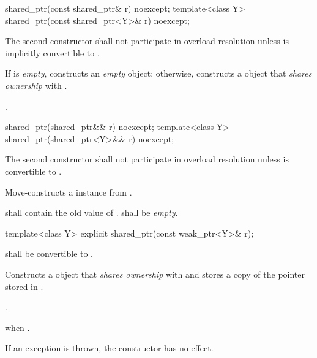 %
\begin{itemdecl}
shared_ptr(const shared_ptr& r) noexcept;
template<class Y> shared_ptr(const shared_ptr<Y>& r) noexcept;
\end{itemdecl}

\begin{itemdescr}
\pnum\remark
The second constructor shall not participate in overload resolution unless
 is implicitly convertible to .

\pnum\effects  If  is \textit{empty}, constructs
an \textit{empty}  object; otherwise, constructs
a  object that \textit{shares ownership} with .

\pnum\postconditions  {}.
\end{itemdescr}

%
\begin{itemdecl}
shared_ptr(shared_ptr&& r) noexcept;
template<class Y> shared_ptr(shared_ptr<Y>&& r) noexcept;
\end{itemdecl}

\begin{itemdescr}
\pnum
\remark The second constructor shall not participate in overload resolution unless
 is convertible to .

\pnum
\effects Move-constructs a  instance from
.

\pnum
\postconditions {} shall contain the old value of
.  shall be \textit{empty}. 
\end{itemdescr}

%
%
\begin{itemdecl}
template<class Y> explicit shared_ptr(const weak_ptr<Y>& r);
\end{itemdecl}

\begin{itemdescr}
\pnum\requires {} shall be convertible to .

\pnum\effects  Constructs a  object that \textit{shares ownership} with
 and stores a copy of the pointer stored in .

\pnum\postconditions  {}.

\pnum\throws  {} when .

\pnum\exceptionsafety  If an exception is thrown, the constructor has no
effect.
\end{itemdescr}

